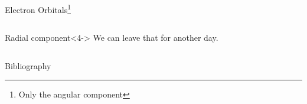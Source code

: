 \documentclass[xetex, onlymath, aspectratio=169]{beamer}
\begin{document}
\begin{frame}{Electron Orbitals\footnote{Only the angular component}}
\begin{columns}
\begin{column}{.5\linewidth}
			\begin{exampleblock}{Radial component}<4->
				We can leave that for another day.
			\end{exampleblock}
		\end{column}
	\end{columns}
\end{frame}


\begin{frame}{Bibliography}
	\renewcommand*{\bibfont}{\tiny}
	\printbibliography
\end{frame}
\end{document}
